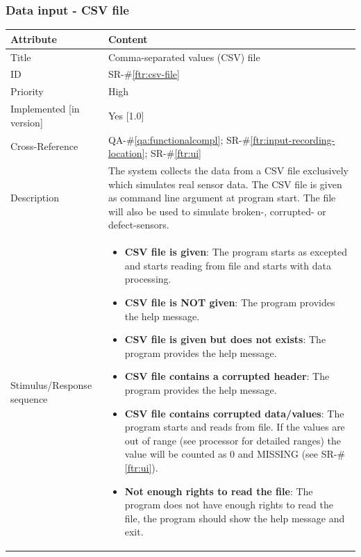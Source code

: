 \documentclass[a4paper]{article}
\begin{document}



\clearpage
\subsubsection{Data input - CSV file}
\label{sec:data-input:csv-file}
\label{ftr:csv-file}
\renewcommand*{\arraystretch}{1.4}
\begin{longtable}[l]{ | >{\columncolor{vu-grey-50}}m{110pt} | m{300pt} | }

    \hline
    \rowcolor{vu-blue}
    \textcolor{vu-white}{\textbf{Attribute}} & \textcolor{vu-white}{\textbf{Content}}
    \\ \hline
    
    Title &
    Comma-separated values (CSV) file
    \\ \hline
    
    ID &
    SR-\#\ref{ftr:csv-file}
    \\ \hline
    
    Priority &
    High
    \\ \hline
    
    Implemented [in version] &
    Yes [1.0]
    \\ \hline
    
    Cross-Reference &
    QA-\#\ref{qa:functionalcompl}; SR-\#\ref{ftr:input-recording-location}; SR-\#\ref{ftr:ui}
    \\ \hline
    
    Description &
    The  system  collects  the  data  from  a  CSV  file  exclusively  which  simulates  real  sensor  data. The CSV file is given as command line argument at program start. The file will also be used to simulate broken-, corrupted- or defect-sensors.
    \\ \hline
    
    Stimulus/Response sequence &
    \begin{itemize}
        \item \textbf{CSV file is given}: The program starts as excepted and starts reading from file and starts with data processing.
        \item \textbf{CSV file is NOT given}: The program provides the help message.
        \item \textbf{CSV file is given but does not exists}: The program provides the help message.
        \item \textbf{CSV file contains a corrupted header}: The program provides the help message.
        \item \textbf{CSV file contains corrupted data/values}: The program starts and reads from file. If the values are out of range (see processor for detailed ranges) the value will be counted as 0 and MISSING (see SR-\#\ref{ftr:ui}).
        \item \textbf{Not enough rights to read the file}: The program does not have enough rights to read the file, the program should show the help message and exit.
    \end{itemize}
    \\ \hline
    

\end{longtable}
\end{document}
